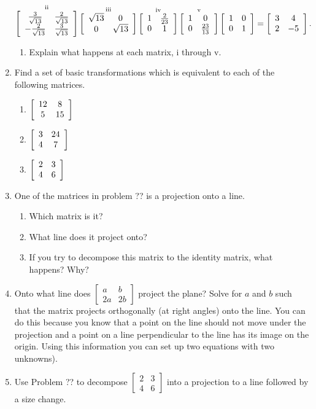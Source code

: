 \documentclass[../gatm.tex]{subfiles}
\begin{document}
\begin{enumerate}
$$\mathop{\left[\begin{array}{cc} \frac{3}{\sqrt{13}} & \frac{2}{\sqrt{13}} \\ -\frac{2}{\sqrt{13}} & \frac{3}{\sqrt{13}} \end{array}\right]}^{\text{ii}}
\mathop{\left[\begin{array}{cc} \sqrt{13} & 0 \\ 0 & \sqrt{13} \end{array}\right]}^{\text{iii}}
\mathop{\left[\begin{array}{cc} 1 & \frac{2}{23} \\ 0 & 1 \end{array}\right]}^{\text{iv}}
\mathop{\left[\begin{array}{cc} 1 & 0 \\ 0 & \frac{23}{13} \end{array}\right]}^{\text{v}}
\left[\begin{array}{cc} 1 & 0 \\ 0 & 1 \end{array}\right]=\left[\begin{array}{cc} 3 & 4 \\ 2 & -5 \end{array}\right].$$
\begin{enumerate}
\item Explain what happens at each matrix, i through v.
\end{enumerate}
\item Find a set of basic transformations which is equivalent to each of the following matrices.
\begin{multicols}{3}
\begin{enumerate}
\item $\left[\begin{array}{cc} 12 & 8 \\ 5 & 15 \end{array}\right]$
\item $\left[\begin{array}{cc} 3 & 24 \\ 4 & 7 \end{array}\right]$
\item $\left[\begin{array}{cc} 2 & 3 \\ 4 & 6 \end{array}\right]$
\end{enumerate}
\end{multicols}
\item One of the matrices in problem ?? is a projection onto a line.
\begin{multicols}{2}
\begin{enumerate}
\item Which matrix is it?
\item What line does it project onto?
\item If you try to decompose this matrix to the identity matrix, what happens? Why?
\end{enumerate}
\end{multicols}
\item Onto what line does $\left[\begin{smallmatrix} a & b \\ 2a & 2b\end{smallmatrix}\right]$ project the plane? Solve for $a$ and $b$ such that the matrix projects orthogonally (at right angles) onto the line. You can do this because you know that a point on the line should not move under the projection and a point on a line perpendicular to the line has its image on the origin. Using this information you can set up two equations with two unknowns).
\item Use Problem ?? to decompose $\left[\begin{smallmatrix} 2 & 3 \\ 4 & 6 \end{smallmatrix}\right]$ into a projection to a line followed by a size change.

\end{enumerate}
\end{document}
